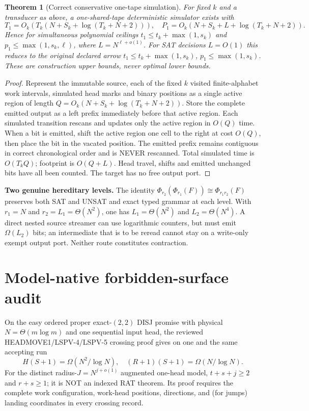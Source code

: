 \documentclass[11pt]{article}
\newtheorem{theorem}{Theorem}
\begin{document}
\begin{theorem}[Correct conservative one-tape simulation]\label{sim}
For fixed $k$ and a transducer as above, a one-shared-tape deterministic simulator exists with
\[
 \boxed{T_1=O_k(T_k(N+S_k+\log(T_k+N+2))),\quad
 P_1=O_k(N+S_k+L+\log(T_k+N+2)).}
\]
Hence for simultaneous polynomial ceilings $t_1\le t_k+\max(1,s_k)$ and $p_1\le\max(1,s_k,\ell)$, where $L=N^{\ell+o(1)}$. For SAT decisions $L=O(1)$ this reduces to the original declared arrow $t_1\le t_k+\max(1,s_k)$, $p_1\le\max(1,s_k)$. These are construction upper bounds, never optimal lower bounds.
\end{theorem}
\begin{proof}
Represent the immutable source, each of the fixed $k$ visited finite-alphabet work intervals, simulated head marks and binary positions as a single active region of length $Q=O_k(N+S_k+\log(T_k+N+2))$. Store the complete emitted output as a left prefix immediately before that active region. Each simulated transition rescans and updates only the active region in $O(Q)$ time. When a bit is emitted, shift the active region one cell to the right at cost $O(Q)$, then place the bit in the vacated position. The emitted prefix remains contiguous in correct chronological order and is NEVER rescanned. Total simulated time is $O(T_kQ)$; footprint is $O(Q+L)$. Head travel, shifts and emitted unchanged bits have all been counted. The target has no free output port.
\end{proof}

\noindent\textbf{Two genuine hereditary levels.} The identity
$\Phi_{r_2}(\Phi_{r_1}(F))\cong\Phi_{r_1r_2}(F)$ preserves both SAT and UNSAT and exact typed grammar at each level. With $r_1=N$ and $r_2=L_1=\Theta(N^2)$, one has $L_1=\Theta(N^2)$ and $L_2=\Theta(N^4)$. A direct nested source streamer can use logarithmic counters, but must emit $\Omega(L_2)$ bits; an intermediate that is to be reread cannot stay on a write-only exempt output port. Neither route constitutes contraction.

\section{Model-native forbidden-surface audit}
On the easy ordered proper exact-$(2,2)$ DISJ promise with physical $N=\Theta(m\log m)$ and one sequential input head, the reviewed HEADMOVE1/LSPV-4/LSPV-5 crossing proof gives on one and the same accepting run
\[
 H(S+1)=\Omega(N^2/\log N),\quad (R+1)(S+1)=\Omega(N/\log N).
\]
For the distinct radius-$J=N^{j+o(1)}$ augmented one-head model, $t+s+j\ge2$ and $r+s\ge1$; it is NOT an indexed RAT theorem. Its proof requires the complete work configuration, work-head positions, directions, and (for jumps) landing coordinates in every crossing record.
\end{document}
